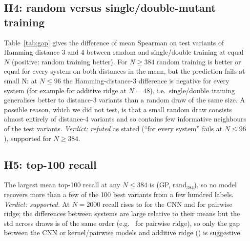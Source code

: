 \subsection{H4: random versus single/double-mutant training}
Table~\ref{tab:gap} gives the difference of mean Spearman on test variants of Hamming distance 3 and 4 between random and single/double training at equal $N$ (positive: random training better). For $N\ge384$ random training is better or equal for every system on both distances in the mean, but the prediction fails at small N: at $N\le96$ the Hamming-distance-3 difference is negative for every system (for example  for additive ridge at $N{=}48$), i.e.\ single/double training generalises better to distance-3 variants than a random draw of the same size. A possible reason, which we did not test, is that a small random draw consists almost entirely of distance-4 variants and so contains few informative neighbours of the test variants. \emph{Verdict: refuted} as stated (``for every system'' fails at $N\le96$), supported for $N\ge384$.

\subsection{H5: top-100 recall}
The largest mean top-100 recall at any $N\le384$ is  (GP, rand$_{384}$), so no model recovers more than a few of the 100 best variants from a few hundred labels. \emph{Verdict: supported.} At $N{=}2000$ recall rises to  for the CNN and  for pairwise ridge; the differences between systems are large relative to their means but the std across draws is of the same order (e.g.\  for pairwise ridge), so only the gap between the CNN or kernel/pairwise models and additive ridge () is suggestive.

\begin{table}[t]\footnotesize\centering\renewcommand{\arraystretch}{0.8}
\caption{Spearman by Hamming distance of the test variant (mean $\pm$ std; HD3, HD4), main group. Test variants at Hamming distance 2 are omitted because fewer than the minimum needed exist in the dbl tasks.}\label{tab:hd}
\resizebox{0.6\textwidth}{!}{}
\end{table}

